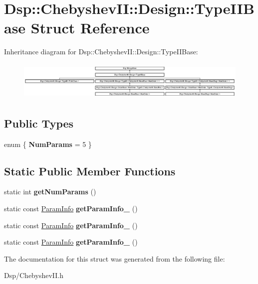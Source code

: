 \hypertarget{structDsp_1_1ChebyshevII_1_1Design_1_1TypeIIBase}{\section{Dsp\-:\-:Chebyshev\-I\-I\-:\-:Design\-:\-:Type\-I\-I\-Base Struct Reference}
\label{structDsp_1_1ChebyshevII_1_1Design_1_1TypeIIBase}
}
Inheritance diagram for Dsp\-:\-:Chebyshev\-I\-I\-:\-:Design\-:\-:Type\-I\-I\-Base\-:\begin{figure}[H]
\begin{center}
\leavevmode
\includegraphics[height=1.877934cm]{structDsp_1_1ChebyshevII_1_1Design_1_1TypeIIBase}
\end{center}
\end{figure}
\subsection*{Public Types}
\begin{DoxyCompactItemize}
\item 
enum \{ {\bfseries Num\-Params} =  5
 \}
\end{DoxyCompactItemize}
\subsection*{Static Public Member Functions}
\begin{DoxyCompactItemize}
\item 
\hypertarget{structDsp_1_1ChebyshevII_1_1Design_1_1TypeIIBase_aa43bfcc95e8489378aa4417e171c68a5}{static int {\bfseries get\-Num\-Params} ()}\label{structDsp_1_1ChebyshevII_1_1Design_1_1TypeIIBase_aa43bfcc95e8489378aa4417e171c68a5}

\item 
\hypertarget{structDsp_1_1ChebyshevII_1_1Design_1_1TypeIIBase_af1e87263a0d138aa84d3e74312aa624e}{static const \hyperlink{classDsp_1_1ParamInfo}{Param\-Info} {\bfseries get\-Param\-Info\-\_} ()}\label{structDsp_1_1ChebyshevII_1_1Design_1_1TypeIIBase_af1e87263a0d138aa84d3e74312aa624e}

\item 
\hypertarget{structDsp_1_1ChebyshevII_1_1Design_1_1TypeIIBase_a74f2e7d8c5889f0e7f9d7079fd902559}{static const \hyperlink{classDsp_1_1ParamInfo}{Param\-Info} {\bfseries get\-Param\-Info\-\_} ()}\label{structDsp_1_1ChebyshevII_1_1Design_1_1TypeIIBase_a74f2e7d8c5889f0e7f9d7079fd902559}

\item 
\hypertarget{structDsp_1_1ChebyshevII_1_1Design_1_1TypeIIBase_a60da3ef7a47cefdc36805f6760189afb}{static const \hyperlink{classDsp_1_1ParamInfo}{Param\-Info} {\bfseries get\-Param\-Info\-\_} ()}\label{structDsp_1_1ChebyshevII_1_1Design_1_1TypeIIBase_a60da3ef7a47cefdc36805f6760189afb}

\end{DoxyCompactItemize}


The documentation for this struct was generated from the following file\-:\begin{DoxyCompactItemize}
\item 
Dsp/Chebyshev\-I\-I.\-h\end{DoxyCompactItemize}
